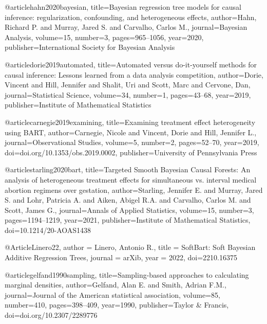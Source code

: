 @article{hahn2020bayesian,
  title={Bayesian regression tree models for causal inference: regularization, confounding, and heterogeneous effects},
  author={Hahn, Richard P. and Murray, Jared S. and Carvalho, Carlos M.},
  journal={Bayesian Analysis},
  volume={15},
  number={3},
  pages={965--1056},
  year={2020},
  publisher={International Society for Bayesian Analysis}
}







@article{dorie2019automated,
  title={Automated versus do-it-yourself methods for causal inference: Lessons learned from a data analysis competition},
  author={Dorie, Vincent and Hill, Jennifer and Shalit, Uri and Scott, Marc and Cervone, Dan},
  journal={Statistical Science},
  volume={34},
  number={1},
  pages={43--68},
  year={2019},
  publisher={Institute of Mathematical Statistics}
}






@article{carnegie2019examining,
  title={Examining treatment effect heterogeneity using BART},
  author={Carnegie, Nicole and Vincent, Dorie and Hill, Jennifer L.},
  journal={Observational Studies},
  volume={5},
  number={2},
  pages={52--70},
  year={2019},
  doi={doi.org/10.1353/obs.2019.0002},
  publisher={University of Pennsylvania Press}
}





@article{starling2020bart,
  title={Targeted Smooth Bayesian Causal Forests: An analysis of heterogeneous treatment effects for simultaneous vs. interval medical abortion regimens over gestation},
  author={Starling, Jennifer E. and Murray, Jared S. and Lohr,  Patricia A. and Aiken, Abigel R.A. and Carvalho, Carlos M. and Scott, James G.},
  journal={Annals of Applied Statistics},
  volume={15},
  number={3},
  pages={1194--1219},
  year={2021},
  publisher={Institute of Mathematical Statistics},
  doi={10.1214/20-AOAS1438}
}





@Article{Linero22,
   author = {Linero, Antonio R.},
   title =  {SoftBart: Soft Bayesian Additive Regression Trees},
   journal = {arXib},
   year =   {2022},
   doi={2210.16375}
}





@article{gelfand1990sampling,
  title={Sampling-based approaches to calculating marginal densities},
  author={Gelfand, Alan E. and Smith, Adrian F.M.},
  journal={Journal of the American statistical association},
  volume={85},
  number={410},
  pages={398--409},
  year={1990},
  publisher={Taylor \& Francis},
  doi={doi.org/10.2307/2289776}
}





